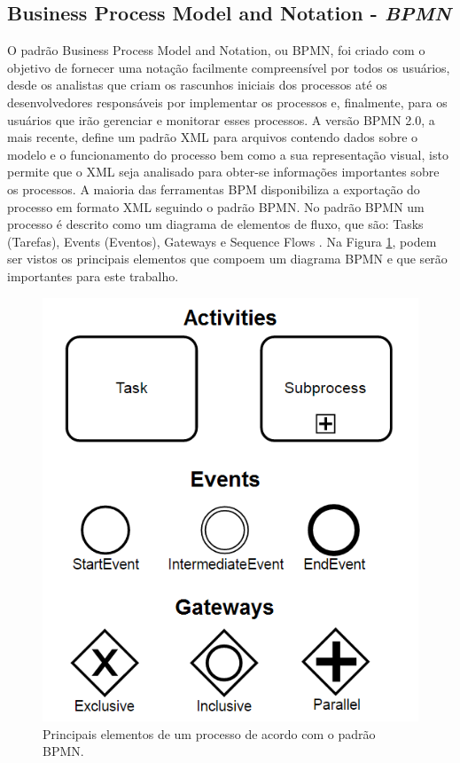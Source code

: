 \documentclass[12pt]{article}
\begin{document}
\subsection{Business Process Model and Notation - \emph{BPMN}}
O padrão Business Process Model and Notation, ou BPMN, foi criado com o objetivo de fornecer uma notação facilmente compreensível por todos os usuários, desde os analistas que criam os rascunhos iniciais dos processos até os desenvolvedores responsáveis por implementar os processos e, finalmente, para os usuários que irão gerenciar e monitorar esses processos\cite{model2011notation}. A versão BPMN 2.0, a mais recente, define um padrão XML para arquivos contendo dados sobre o modelo e o funcionamento do processo bem como a sua representação visual\cite{kurzdiagram}, isto permite que o XML seja analisado para obter-se informações importantes sobre os processos. A maioria das ferramentas BPM disponibiliza a exportação do processo em formato XML seguindo o padrão BPMN. No padrão BPMN um processo é descrito como um diagrama de elementos de fluxo, que são: Tasks (Tarefas), Events (Eventos), Gateways e Sequence Flows \cite{kurzdiagram}. Na Figura \ref{fig:bpmn}, podem ser vistos os principais elementos que compoem um diagrama BPMN e que serão importantes para este trabalho.


\begin{figure}[ht]
\centering
\includegraphics[width=.8\textwidth]{figuras/bpmn.png}
\caption{Principais elementos de um processo de acordo com o padrão BPMN.}
\label{fig:bpmn}
\end{figure}
\end{document}

